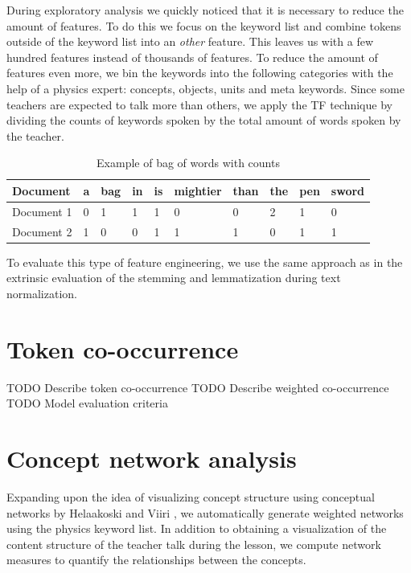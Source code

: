 \documentclass[utf8,english]{gradu3}
\begin{document}
During exploratory analysis we quickly noticed that it is necessary to reduce the amount of features. To do this we focus on the keyword list and combine tokens outside of the keyword list into an \emph{other} feature. This leaves us with a few hundred features instead of thousands of features. To reduce the amount of features even more, we bin the keywords into the following categories with the help of a physics expert: concepts, objects, units and meta keywords. Since some teachers are expected to talk more than others, we apply the TF technique by dividing the counts of keywords spoken by the total amount of words spoken by the teacher.

\begin{table}[]
  \begin{tabular}{ | l | l | l | l | l | l | l | l | l | l |}
    \hline
    \textbf{Document} & \textbf{a} & \textbf{bag} & \textbf{in} & \textbf{is} & \textbf{mightier} & \textbf{than} & \textbf{the} & \textbf{pen} & \textbf{sword}\\ \hline
    Document 1 & 0 & 1 & 1 & 1 & 0 & 0 & 2 & 1 & 0\\ \hline
    Document 2 & 1 & 0 & 0 & 1 & 1 & 1 & 0 & 1 & 1\\
    \hline
  \end{tabular}
  \caption{Example of bag of words with counts}
  \label{table:counts}
\end{table}

To evaluate this type of feature engineering, we use the same approach as in the extrinsic evaluation of the stemming and lemmatization during text normalization.
\section{Token co-occurrence}
TODO Describe token co-occurrence \parencite{jurafskySpeechLanguageProcessing2019, bullinariaExtractingSemanticRepresentations2007}
TODO Describe weighted co-occurrence
TODO Model evaluation criteria

\section{Concept network analysis}

Expanding upon the idea of visualizing concept structure using conceptual networks by Helaakoski and Viiri \parencite*{helaakoskiContentContentStructure2014}, we automatically generate weighted networks using the physics keyword list. In addition to obtaining a visualization of the content structure of the teacher talk during the lesson, we compute network measures to quantify the relationships between the concepts.
\end{document}
